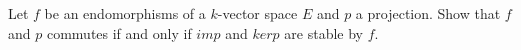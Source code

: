 Let $f$ be an endomorphisms of a $k$-vector space $E$ and $p$ a projection. Show that $f$ and $p$ commutes if and only if $im p$ and $ker p$ are stable by $f$.